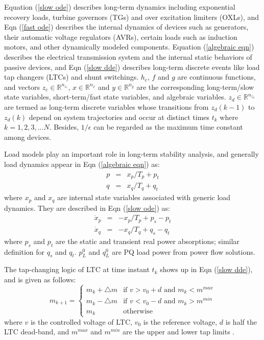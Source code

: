 \documentclass[journal]{IEEEtran}
\newcommand{\ee}{\epsilon}
\begin{document}
Equation (\ref{slow ode}) describes long-term dynamics including exponential recovery loads, turbine governors (TGs) and over excitation limiters (OXLs), and Eqn (\ref{fast ode}) describes the internal dynamics of devices such as generators, their automatic voltage regulators (AVRs), certain loads such as induction motors, and other dynamically modeled components. Equation (\ref{algebraic eqn}) describes the electrical transmission system and the internal static behaviors of passive devices, and Eqn (\ref{slow dde}) describes long-term discrete events like load tap changers (LTCs) and shunt switchings. $h_c$, $f$ and $g$ are continuous functions, and vectors $z_c\in\mathbb{R}^{n_{z_c}}$, ${x}\in\mathbb{R}^{n_x}$ and ${y}\in\mathbb{R}^{n_y}$ are the corresponding long-term/slow state variables, short-term/fast state variables, and algebraic variables. $z_d\in\mathbb{R}^{n_{z_d}}$ are termed as long-term discrete variables whose transitions from $z_d(k-1)$ to $z_d(k)$ depend on system trajectories and occur at distinct times $t_k$ where $k=1,2,3,...N$. Besides, $1/\ee$ can be regarded as the maximum time constant among devices.

Load models play an important role in long-term stability analysis, and generally load dynamics appear in Eqn (\ref{algebraic eqn}) as:
\begin{eqnarray}\label{Aleqn5}
p&=&x_p/T_p+p_t\\
q&=&x_q/T_q+q_t\label{Aleqn6}
\end{eqnarray}
where $x_p$ and $x_q$ are internal state variables associated with generic load dynamics. They are described in Eqn (\ref{slow ode}) as:
\begin{eqnarray}\label{Lcdfeqn3}
{\dot{x}_p}&=&-x_p/T_p+p_s-p_t\\
{\dot{x}_q}&=&-x_q/T_q+q_s-q_t\label{Lcdfeqn4}
\end{eqnarray}
where $p_s$ and $p_t$ are the static and transient real power absorptions; similar definition for $q_s$ and $q_t$. $p^0_L$ and $q^0_L$ are PQ load power from power flow solutions\cite{Kundur:book}\cite{Milano:article}.

The tap-changing logic of LTC at time instant $t_k$ shows up in Eqn (\ref{slow dde}), and is given as follows:
\begin{equation}\label{Ldeqn1}
m_{k+1}=\left\{\begin{array}{ll}m_k+\triangle{m}&\mbox{if  }v>v_0+d\mbox{  and  }m_k<m^{max}\\
m_k-\triangle{m}&\mbox{if  }v<v_0-d\mbox{  and  }m_k>m^{min}\\
m_k &\mbox{otherwise}\end{array}\right.
\end{equation}
where $v$ is the controlled voltage of LTC, $v_0$ is the reference voltage, $d$ is half the LTC dead-band, and $m^{max}$ and $m^{min}$ are the upper and lower tap limits \cite{Cutsem:book}\cite{Kundur:book}\cite{Milano:article}.
\end{document}
